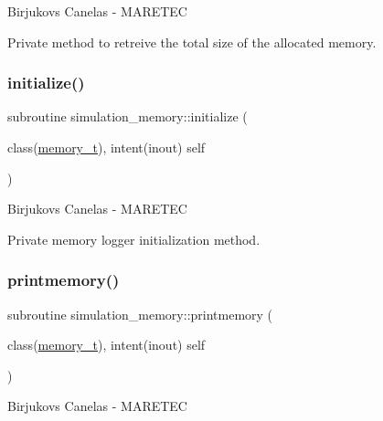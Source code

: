 Birjukovs Canelas -\/ M\+A\+R\+E\+T\+EC 

Private method to retreive the total size of the allocated memory. \mbox{\label{namespacesimulation__memory_a3b8f4e0766c90e6d6bd99e2fa49ea91b}} 
\subsubsection{\texorpdfstring{initialize()}{initialize()}}
{\footnotesize\ttfamily subroutine simulation\+\_\+memory\+::initialize (\begin{DoxyParamCaption}\item[{class(\hyperlink{structsimulation__memory_1_1memory__t}{memory\+\_\+t}), intent(inout)}]{self }\end{DoxyParamCaption})\hspace{0.3cm}{\ttfamily [private]}}



Birjukovs Canelas -\/ M\+A\+R\+E\+T\+EC 

Private memory logger initialization method. \mbox{\label{namespacesimulation__memory_a5827bef8479b809a453af147ceaa8c7c}} 
\subsubsection{\texorpdfstring{printmemory()}{printmemory()}}
{\footnotesize\ttfamily subroutine simulation\+\_\+memory\+::printmemory (\begin{DoxyParamCaption}\item[{class(\hyperlink{structsimulation__memory_1_1memory__t}{memory\+\_\+t}), intent(inout)}]{self }\end{DoxyParamCaption})\hspace{0.3cm}{\ttfamily [private]}}



Birjukovs Canelas -\/ M\+A\+R\+E\+T\+EC 

